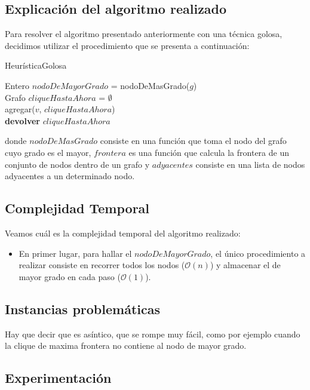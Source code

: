 \subsection{Explicación del algoritmo realizado}
Para resolver el algoritmo presentado anteriormente con una técnica golosa, decidimos utilizar el procedimiento que se presenta a continuación:\newline
\newline
\begin{algorithm}[H]
    \SetAlgoLined
    \caption{HeurísticaGolosa}
	Entero $nodoDeMayorGrado$ = nodoDeMasGrado($g$)\\
	Grafo $cliqueHastaAhora$ = $\emptyset$\\
	agregar($v$, $cliqueHastaAhora$)\\
\textbf{devolver} $cliqueHastaAhora$
\end{algorithm}

donde $nodoDeMasGrado$ consiste en una función que toma el nodo del grafo cuyo grado es el mayor, $frontera$ es una función que calcula la frontera de un conjunto de nodos dentro de un grafo y $adyacentes$ consiste en una lista de nodos adyacentes a un determinado nodo.\newline



\subsection{Complejidad Temporal}
Veamos cuál es la complejidad temporal del algoritmo realizado:
\begin{itemize}
\item En primer lugar, para hallar el $nodoDeMayorGrado$, el único procedimiento a realizar consiste en recorrer todos los nodos ($\mathcal{O}(n)$) y almacenar el de mayor grado en cada paso ($\mathcal{O}(1)$).
\end{itemize}
\subsection{Instancias problemáticas}
Hay que decir que es asíntico, que se rompe muy fácil, como por ejemplo cuando la clique de maxima frontera no contiene al nodo de mayor grado.
\subsection{Experimentación}



